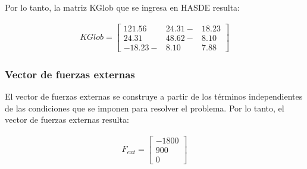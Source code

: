 Por lo tanto, la matriz KGlob que se ingresa en HASDE resulta:

\begin{eqnarray}
	KGlob = \left[
	\begin{array}{lll}
	121.56 & 24.31  -&18.23 \\
	24.31 & 48.62  -&8.10 \\
	-18.23  -&8.10 &7.88	
	\end{array}
	\right]
\end{eqnarray}

\subsubsection{Vector de fuerzas externas}

El vector de fuerzas externas se construye a partir de los términos independientes de las condiciones que se imponen para resolver el problema. Por lo tanto, el vector de fuerzas externas resulta:

\begin{eqnarray}
F_{ext} = \left[
\begin{array}{l}
-1800 \\
900 \\
0
\end{array}
\right]
\end{eqnarray}

